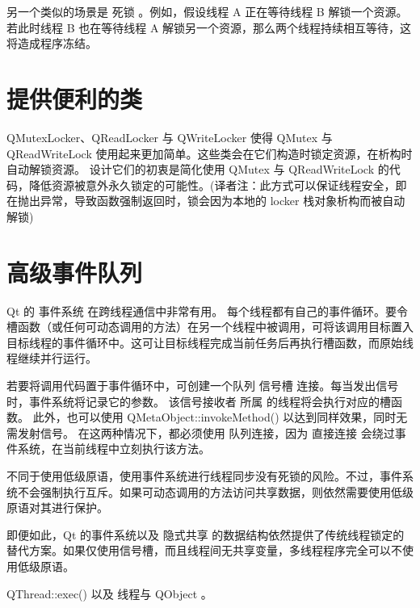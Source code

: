 另一个类似的场景是 死锁 。例如，假设线程 A 正在等待线程 B 解锁一个资源。若此时线程 B 也在等待线程 A 解锁另一个资源，那么两个线程持续相互等待，这将造成程序冻结。

\section{提供便利的类}

QMutexLocker、QReadLocker 与 QWriteLocker 使得 QMutex 与 QReadWriteLock 使用起来更加简单。这些类会在它们构造时锁定资源，在析构时自动解锁资源。
设计它们的初衷是简化使用 QMutex 与 QReadWriteLock 的代码，降低资源被意外永久锁定的可能性。(译者注：此方式可以保证线程安全，即在抛出异常，导致函数强制返回时，锁会因为本地的 locker 栈对象析构而被自动解锁)


\section{高级事件队列}

Qt 的 事件系统 在跨线程通信中非常有用。
每个线程都有自己的事件循环。要令槽函数（或任何可动态调用的方法）在另一个线程中被调用，可将该调用目标置入目标线程的事件循环中。这可让目标线程完成当前任务后再执行槽函数，而原始线程继续并行运行。

若要将调用代码置于事件循环中，可创建一个队列 信号槽 连接。每当发出信号时，事件系统将记录它的参数。
该信号接收者 所属 的线程将会执行对应的槽函数。
此外，也可以使用 QMetaObject::invokeMethod() 以达到同样效果，同时无需发射信号。
在这两种情况下，都必须使用 队列连接，因为 直接连接 会绕过事件系统，在当前线程中立刻执行该方法。

不同于使用低级原语，使用事件系统进行线程同步没有死锁的风险。不过，事件系统不会强制执行互斥。如果可动态调用的方法访问共享数据，则依然需要使用低级原语对其进行保护。

即便如此，Qt 的事件系统以及 隐式共享 的数据结构依然提供了传统线程锁定的替代方案。如果仅使用信号槽，而且线程间无共享变量，多线程程序完全可以不使用低级原语。

\begin{seeAlso}
QThread::exec() 以及 线程与 QObject 。
\end{seeAlso}
